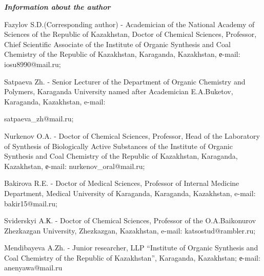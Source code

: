 \emph{{\bfseries Information about the author}}

\begin{noparindent}
Fazylov S.D.(Corresponding author) - Academician of the National Academy
of Sciences of the Republic of Kazakhstan, Doctor of Chemical Sciences,
Professor, Chief Scientific Associate of the Institute of Organic
Synthesis and Coal Chemistry of the Republic of Kazakhstan, Karaganda,
Kazakhstan, е-mail: iosu8990@mail.ru;

Satpaeva Zh. - Senior Lecturer of the Department of Organic Chemistry
and Polymers, Karaganda University named after Academician E.A.Buketov,
Karaganda, Kazakhstan, e-mail:

satpaeva\_zh@mail.ru;

Nurkenov O.A. - Doctor of Chemical Sciences, Professor, Head of the
Laboratory of Synthesis of Biologically Active Substances of the
Institute of Organic Synthesis and Coal Chemistry of the Republic of
Kazakhstan, Karaganda, Kazakhstan, е-mail: nurkenov\_oral@mail.ru;

Bakirova R.E. - Doctor of Medical Sciences, Professor of Internal
Medicine Department, Medical University of Karaganda, Karaganda,
Kazakhstan, e-mail: bakir15@mail.ru;

Sviderskyi A.К. - Doctor of Chemical Sciences, Professor of the
O.A.Baikonurov Zhezkazgan University, Zhezkazgan, Kazakhstan, e-mail:
katsostud@rambler.ru;

Mendibayeva A.Zh. - Junior researcher, LLP ``Institute of Organic
Synthesis and Coal Chemistry of the Republic of Kazakhstan'', Karaganda,
Kazakhstan; е-mail: anenyawa@mail.ru
\end{noparindent}
